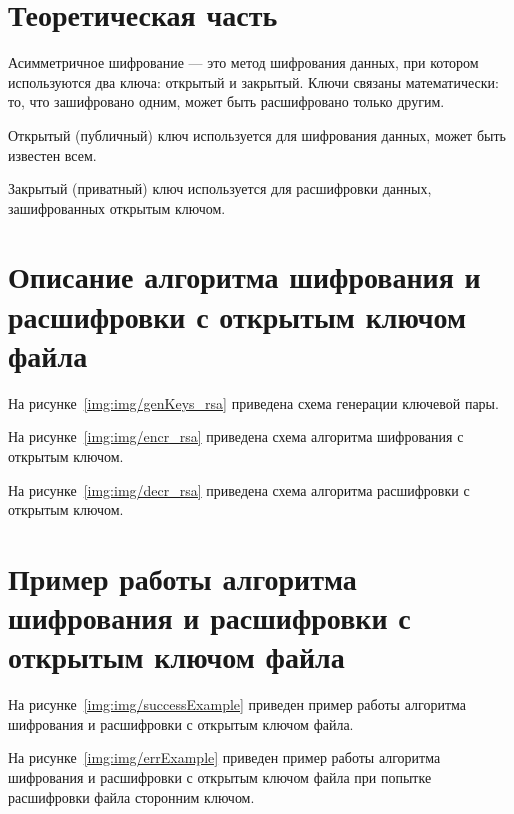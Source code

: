 \chapter{Теоретическая часть}

Асимметричное шифрование — это метод шифрования данных, при котором используются два ключа: открытый и закрытый. Ключи связаны математически: то, что зашифровано одним, может быть расшифровано только другим. 

Открытый (публичный) ключ используется для шифрования данных, может быть известен всем.

Закрытый (приватный) ключ используется для расшифровки данных, зашифрованных открытым ключом.


\chapter{Описание алгоритма шифрования и расшифровки с открытым ключом файла}

На рисунке~\ref{img:img/genKeys_rsa} приведена схема генерации ключевой пары.

\FloatBarrier
{}
\FloatBarrier

На рисунке~\ref{img:img/encr_rsa} приведена схема алгоритма шифрования с открытым ключом.

\FloatBarrier
{}
\FloatBarrier

На рисунке~\ref{img:img/decr_rsa} приведена схема алгоритма расшифровки с открытым ключом.

\FloatBarrier
{}
\FloatBarrier

\chapter{Пример работы алгоритма шифрования и расшифровки с открытым ключом файла}

На рисунке~\ref{img:img/successExample} приведен пример работы алгоритма шифрования и расшифровки с открытым ключом файла.

\FloatBarrier
{}
\FloatBarrier

\clearpage
На рисунке~\ref{img:img/errExample} приведен пример работы алгоритма шифрования и расшифровки с открытым ключом файла при попытке расшифровки файла сторонним ключом.

